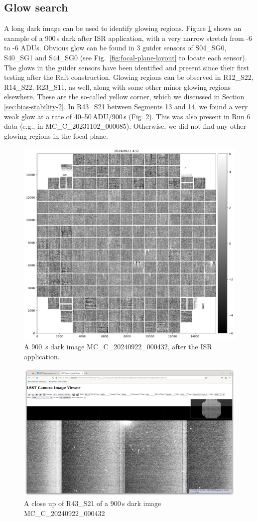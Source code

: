\clearpage
\subsection{Glow search}
A long dark image can be used to identify glowing regions. Figure \ref{fig:glowsearch} shows an example of a 900\,s dark after ISR application, with a very narrow stretch from -6 to -6 ADUs.
Obvious glow can be found in 3 guider sensors of S04\_SG0, S40\_SG1 and S44\_SG0 (see Fig.~\ref{fig:focal-plane-layout} to locate each sensor). The glows in the guider sensors have been identified and present since their first testing after the Raft construction.
Glowing regions can be observed in R12\_S22, R14\_S22, R23\_S11, as well, along with some other minor glowing regions elsewhere. These are the so-called yellow corner, which we discussed in Section \ref{sec:bias-stability-2}.
In R43\_S21 between Segments 13 and 14, we found a very weak glow at a rate of 40--50\,ADU/900\,s (Fig. \ref{fig:glowsearch:closeup}). This was also present in Run 6 data (e.g., in MC\_C\_20231102\_000085).
Otherwise, we did not find any other glowing regions in the focal plane.

\begin{figure}
    \centering
    \includegraphics[width=0.5\linewidth]{figures/glowsearch/900sdark.png}
    \caption{A 900\, s dark image MC\_C\_20240922\_000432, after the ISR application.}
    \label{fig:glowsearch}
\end{figure}
\begin{figure}
    \centering
    \includegraphics[width=1.0\linewidth]{figures/glowsearch/R43S21.png}
    \caption{A close up of R43\_S21 of a 900\,s dark image MC\_C\_20240922\_000432}
    \label{fig:glowsearch:closeup}
\end{figure}

